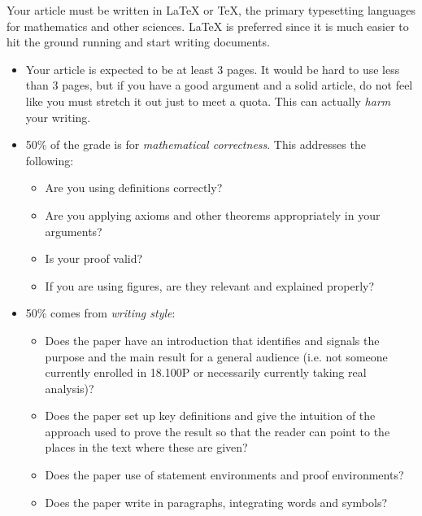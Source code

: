 \documentclass{article}
\begin{document}
    \par\hfill\par
    Your article must be written in \LaTeX{} or \TeX, the primary typesetting
    languages for mathematics and other sciences. \LaTeX{} is preferred since it
    is much easier to hit the ground running and start writing documents.
    \begin{itemize}
        \item
            Your article is expected to be at least 3 pages.
            It would be hard to use less than 3 pages, but if you have
            a good argument and a solid article, do not feel like you
            must stretch it out just to meet a quota. This can actually
            \textit{harm} your writing.
        \item
            50\% of the grade is for \textit{mathematical correctness}.
            This addresses the following:
            \begin{itemize}
                \item
                    Are you using definitions correctly?
                \item
                    Are you applying axioms and other theorems
                    appropriately in your arguments?
                \item
                    Is your proof valid?
                \item
                    If you are using figures, are they relevant and explained
                    properly?
            \end{itemize}
        \item
            50\% comes from \textit{writing style}:
            \begin{itemize}
                \item
                     Does the paper have an introduction that identifies
                     and signals the purpose and the main result for a
                     general audience (i.e. not someone currently enrolled
                     in 18.100P or necessarily currently taking real analysis)?
                \item
                    Does the paper set up key definitions and give the
                    intuition of the approach used to prove the result
                    so that the reader can point to the places in the
                    text where these are given?
                \item
                    Does the paper use of statement environments
                    and proof environments?
                \item
                    Does the paper write in paragraphs,
                    integrating words and symbols?
            \end{itemize}
    \end{itemize}
\end{document}
